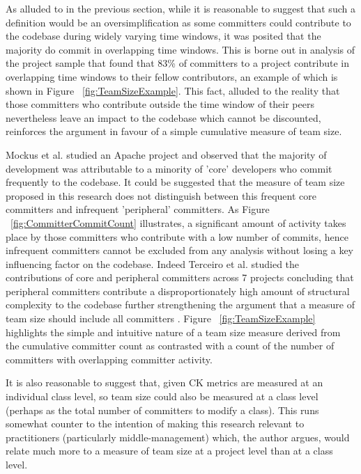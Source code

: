 As alluded to in the previous section, while it is reasonable to suggest that such a definition would be an oversimplification as some committers could contribute to the codebase during widely varying time windows, it was posited that the majority do commit in overlapping time windows. This is borne out in analysis of the project sample that found that 83\% of committers to a project contribute in overlapping time windows to their fellow contributors, an example of which is shown in Figure ~\ref{fig:TeamSizeExample}. This fact, alluded to the reality that those committers who contribute outside the time window of their peers nevertheless leave an impact to the codebase which cannot be discounted, reinforces the argument in favour of a simple cumulative measure of team size.

Mockus et al. studied an Apache project and observed that the majority of development was attributable to a minority of 'core' developers \citep{mockus2000case} who commit frequently to the codebase. It could be suggested that the measure of team size proposed in this research does not distinguish between this frequent core committers and infrequent 'peripheral' committers. As Figure ~\ref{fig:CommitterCommitCount} illustrates, a significant amount of activity takes place by those committers who contribute with a low number of commits, hence infrequent committers cannot be excluded from any analysis without losing a key influencing factor on the codebase. Indeed Terceiro et al. studied the contributions of core and peripheral committers across 7 projects concluding that peripheral committers contribute a disproportionately high amount of structural complexity to the codebase further strengthening the argument that a measure of team size should include all committers \citep{terceiro2010empirical}. Figure ~\ref{fig:TeamSizeExample} highlights the simple and intuitive nature of a team size measure derived from the cumulative committer count as contrasted with a count of the number of committers with overlapping committer activity.

It is also reasonable to suggest that, given CK metrics are measured at an individual class level, so team size could also be measured at a class level (perhaps as the total number of committers to modify a class). This runs somewhat counter to the intention of making this research relevant to practitioners (particularly middle-management) which, the author argues, would relate much more to a measure of team size at a project level than at a class level.

